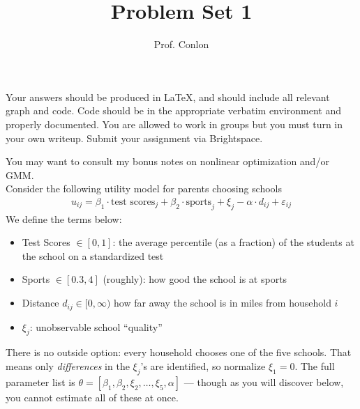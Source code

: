 \documentclass{article}
\title{Problem Set 1}
\begin{document}
\small
\date{}
\author{Prof. Conlon}
\maketitle
Your answers should be produced in \LaTeX, and should include all relevant graph and code.  Code should be in the appropriate verbatim environment and properly documented. You are allowed to work in groups but you must turn in your own writeup. Submit your assignment via Brightspace.

You may want to consult my bonus notes on nonlinear optimization and/or GMM.\\

Consider the following utility model for parents choosing schools
\begin{align*}
u_{ij} = \beta_1 \cdot \text{test scores}_j  +\beta_2 \cdot \text{sports}_j+ \xi_j - \alpha \cdot d_{ij} +  \varepsilon_{ij}
\end{align*}
We define the terms below:
\begin{itemize}
	\item Test Scores $\in [0,1]$: the average percentile (as a fraction) of the students at the school on a standardized test
	\item Sports $\in [0.3, 4]$ (roughly): how good the school is at sports
	\item Distance $d_{ij} \in [0,\infty)$ how far away the school is in miles from household $i$
	\item $\xi_j$: unobservable school ``quality''
\end{itemize}
There is no outside option: every household chooses one of the five schools. That means only \emph{differences} in the $\xi_j$'s are identified, so normalize $\xi_1 = 0$. The full parameter list is $\theta = [\beta_1,\beta_2, \xi_2,\ldots,\xi_5, \alpha]$ --- though as you will discover below, you cannot estimate all of these at once.
\end{document}
